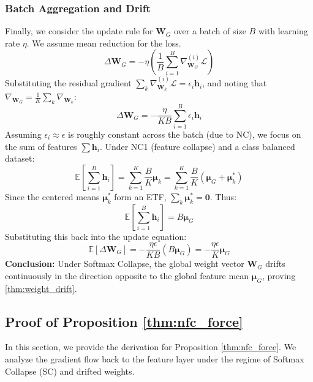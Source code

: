 \documentclass{article}
\theoremstyle{plain}
\theoremstyle{definition}
\theoremstyle{remark}
\begin{document}
\subsubsection{Batch Aggregation and Drift}
Finally, we consider the update rule for $\bm{W}_G$ over a batch of size $B$ with learning rate $\eta$. We assume mean reduction for the loss.
\begin{equation}
    \Delta \bm{W}_G = - \eta \left( \frac{1}{B} \sum_{i=1}^B \nabla_{\bm{W}_G}^{(i)} \mathcal{L} \right)
\end{equation}
Substituting the residual gradient $\sum_k \nabla_{\bm{W}_k}^{(i)} \mathcal{L} = \epsilon_i \bm{h}_i$, and noting that $\nabla_{\bm{W}_G} = \frac{1}{K} \sum_k \nabla_{\bm{W}_k}$:
\begin{equation}
    \Delta \bm{W}_G = - \frac{\eta}{KB} \sum_{i=1}^B \epsilon_i \bm{h}_i
\end{equation}
Assuming $\epsilon_i \approx \epsilon$ is roughly constant across the batch (due to NC), we focus on the sum of features $\sum \bm{h}_i$. Under NC1 (feature collapse) and a class balanced dataset:
\begin{equation}
    \mathbb{E}\left[\sum_{i=1}^B \bm{h}_i\right] = \sum_{k=1}^K \frac{B}{K} \bm{\mu}_k = \sum_{k=1}^K \frac{B}{K} (\bm{\mu}_G + \bm{\mu}_k^*)
\end{equation}
Since the centered means $\bm{\mu}_k^*$ form an ETF, $\sum_k \bm{\mu}_k^* = \mathbf{0}$. Thus:
\begin{equation}
    \mathbb{E}\left[\sum_{i=1}^B \bm{h}_i\right] = B \bm{\mu}_G
\end{equation}
Substituting this back into the update equation:
\begin{equation}
    \mathbb{E}[\Delta \bm{W}_G] = - \frac{\eta \epsilon}{KB} (B \bm{\mu}_G) = - \frac{\eta \epsilon}{K} \bm{\mu}_G
\end{equation}
\textbf{Conclusion:} Under Softmax Collapse, the global weight vector $\bm{W}_G$ drifts continuously in the direction opposite to the global feature mean $\bm{\mu}_G$, proving \cref{thm:weight_drift}.

\subsection{Proof of Proposition \ref{thm:nfc_force}}
\label{app:proof_nfc_force}

In this section, we provide the derivation for Proposition \ref{thm:nfc_force}. 
We analyze the gradient flow back to the feature layer under the regime of Softmax Collapse (SC) and drifted weights.
\end{document}
